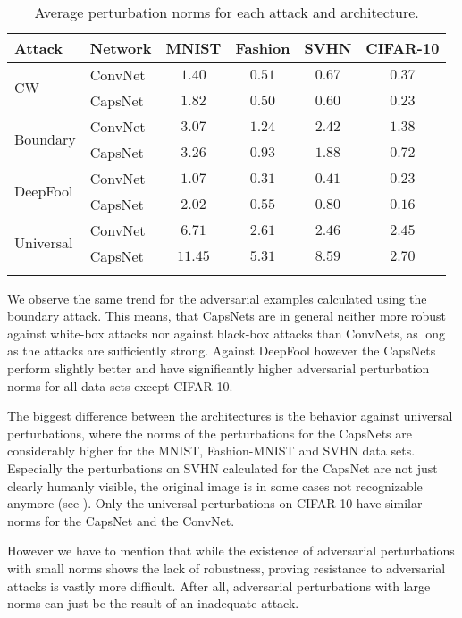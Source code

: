 \begin{table}
	\centering\
	\begin{tabular}{llcccc}
		\toprule
		Attack & Network       & MNIST & Fashion & SVHN & CIFAR-10  \\
		\midrule
		\multirow{2}{*}{CW} & ConvNet & {$1.40$} & $0.51$ & $0.67$ & $0.37$ \\
		& CapsNet            & $1.82$ & {$0.50$} & {$0.60$} & {$0.23$} \\
		\midrule
		\multirow{2}{*}{Boundary} & ConvNet & {$3.07$} & $1.24$ & $2.42$ & $1.38$ \\
		& CapsNet            & $3.26$ & {$0.93$} & {$1.88$} & {$0.72$} \\
		\midrule
		\multirow{2}{*}{DeepFool} & ConvNet & {$1.07$} & {$0.31$} & {$0.41$} & $0.23$ \\
		& CapsNet           & $2.02$ & $0.55$ & $0.80$ & {$0.16$} \\
		\midrule
		\multirow{2}{*}{Universal} & ConvNet & {$6.71$} & {$2.61$} & {$2.46$} & {$2.45$} \\
		& CapsNet           & $11.45$ & $5.31$ & $8.59$ & $2.70$ \\
		\bottomrule\\
	\end{tabular}
	\caption[Average Perturbation Norms]{Average perturbation norms for each attack and architecture.}
	\label{tab:norms}
\end{table}

We observe the same trend for the adversarial examples calculated using the boundary attack.
This means, that CapsNets are in general neither more robust against white-box attacks nor against black-box attacks than ConvNets, as long as the attacks are sufficiently strong.
Against DeepFool however the CapsNets perform slightly better and have significantly higher adversarial perturbation norms for all data sets except CIFAR-10.

The biggest difference between the architectures is the behavior against universal perturbations, where the norms of the perturbations for the CapsNets are considerably higher for the MNIST, Fashion-MNIST and SVHN data sets. Especially the perturbations on SVHN calculated for the CapsNet are not just clearly humanly visible, the original image is in some cases not recognizable anymore (see ).
Only the universal perturbations on CIFAR-10 have similar norms for the CapsNet and the ConvNet.

However we have to mention that while the existence of adversarial perturbations with small norms shows the lack of robustness, proving resistance to adversarial attacks is vastly more difficult.
After all, adversarial perturbations with large norms can just be the result of an inadequate attack.

